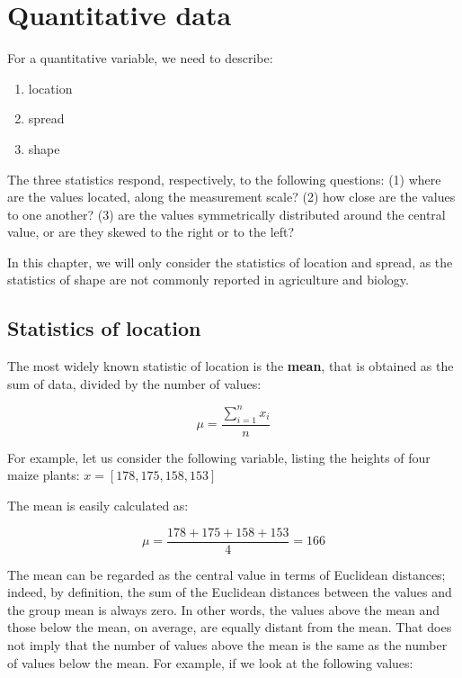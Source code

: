 \documentclass[a4paper,12pt,oneside]{book}
\providecommand{\tightlist}{%
  \setlength{\itemsep}{0pt}\setlength{\parskip}{0pt}}
\begin{document}
\hypertarget{quantitative-data}{%
\section{Quantitative data}\label{quantitative-data}}

For a quantitative variable, we need to describe:

\begin{enumerate}
\def\labelenumi{\arabic{enumi}.}
\tightlist
\item
  location
\item
  spread
\item
  shape
\end{enumerate}

The three statistics respond, respectively, to the following questions: (1) where are the values located, along the measurement scale? (2) how close are the values to one another? (3) are the values symmetrically distributed around the central value, or are they skewed to the right or to the left?

In this chapter, we will only consider the statistics of location and spread, as the statistics of shape are not commonly reported in agriculture and biology.

\hypertarget{statistics-of-location}{%
\subsection{Statistics of location}\label{statistics-of-location}}

The most widely known statistic of location is the \textbf{mean}, that is obtained as the sum of data, divided by the number of values:

\[\mu = \frac{\sum\limits_{i = 1}^n x_i}{n}\]

For example, let us consider the following variable, listing the heights of four maize plants: \(x = [178, 175, 158, 153]\)

The mean is easily calculated as:

\[\mu = \frac{178 + 175 + 158 + 153}{4} = 166\]

The mean can be regarded as the central value in terms of Euclidean distances; indeed, by definition, the sum of the Euclidean distances between the values and the group mean is always zero. In other words, the values above the mean and those below the mean, on average, are equally distant from the mean. That does not imply that the number of values above the mean is the same as the number of values below the mean. For example, if we look at the following values:
\end{document}
